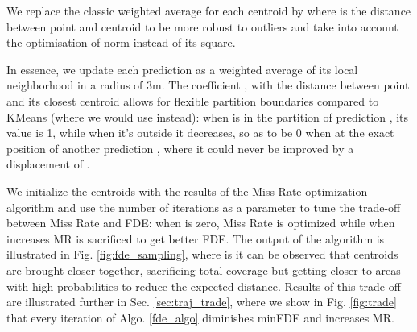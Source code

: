 \documentclass[letterpaper, 10 pt, conference]{ieeeconf}
\begin{document}
We replace the classic weighted average  for each centroid  by  where  is the distance between point  and centroid  to be more robust to outliers and take into account the optimisation of  norm instead of its square.



In essence, we update each prediction as a weighted average of its local neighborhood in a radius of 3m. The coefficient , with  the distance between point  and its closest centroid allows for flexible partition boundaries compared to KMeans (where we would use  instead): when  is in the partition of prediction , its value is 1, while when it's outside it decreases, so as to be 0 when at the exact position of another prediction , where it could never be improved by a displacement of .

We initialize the centroids with the results of the Miss Rate optimization algorithm and use the number of iterations  as a parameter to tune the trade-off between Miss Rate and FDE: when  is zero, Miss Rate is optimized while when  increases MR is sacrificed to get better FDE. The output of the algorithm is illustrated in Fig. \ref{fig:fde_sampling}, where is it can be observed that centroids are brought closer together, sacrificing total coverage but getting closer to areas with high probabilities to reduce the expected distance. Results of this trade-off are illustrated further in Sec. \ref{sec:traj_trade}, where we show in Fig. \ref{fig:trade} that every iteration of Algo. \ref{fde_algo} diminishes minFDE and increases MR.
\end{document}
